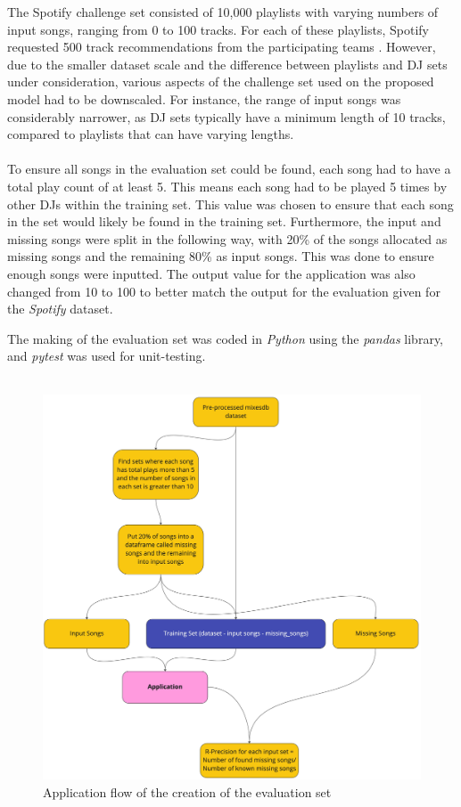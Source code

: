 The Spotify challenge set consisted of 10,000 playlists with varying numbers of input songs, ranging from 0 to 100 tracks. For each of these playlists, Spotify requested 500 track recommendations from the participating teams \citep{aicrowd_aicrowd_2023}. However, due to the smaller dataset scale and the difference between playlists and DJ sets under consideration, various aspects of the challenge set used on the proposed model had to be downscaled. For instance, the range of input songs was considerably narrower, as DJ sets typically have a minimum length of 10 tracks, compared to playlists that can have varying lengths.
\\
\\
To ensure all songs in the evaluation set could be found, each song had to have a total play count of at least 5. This means each song had to be played 5 times by other DJs within the training set. This value was chosen to ensure that each song in the set would likely be found in the training set. Furthermore, the input and missing songs were split in the following way, with 20\% of the songs allocated as missing songs and the remaining 80\% as input songs. This was done to ensure enough songs were inputted. The output value for the application was also changed from 10 to 100 to better match the output for the evaluation given for the \textit{Spotify} dataset.

The making of the evaluation set was coded in \textit{Python} using the \textit{pandas} library, and \textit{pytest} was used for unit-testing.
\\
\\
\begin{figure}[H]
	\includegraphics[scale=0.1]{images/evaluation_set_app_flow}
	\centering
	\caption{Application flow of the creation of the evaluation set} 
\end{figure}
\break
